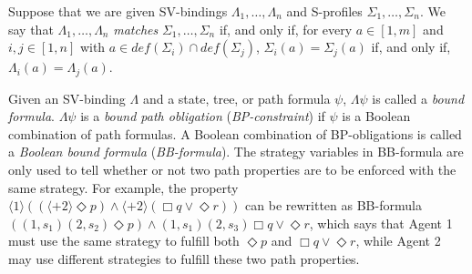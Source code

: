 \documentclass[11pt]{article}
\newcommand{\emdef}{\textit{def}}
\newcommand{\pfrr}{\Box}
\newcommand{\pevt}{\Diamond}
\begin{document}
Suppose that we are given SV-bindings $\Lambda_1,\ldots,\Lambda_n$
and S-profiles $\Sigma_1,\ldots,\Sigma_n$.   
We say that $\Lambda_1,\ldots,\Lambda_n$ {\em matches} 
$\Sigma_1,\ldots,\Sigma_n$ if, and only if, 
for every $a\in[1,m]$ and $i,j\in[1,n]$ 
with $a\in\emdef(\Sigma_i)\cap\emdef(\Sigma_j)$, 
$\Sigma_i(a)=\Sigma_j(a)$ if, and only if, 
$\Lambda_i(a)=\Lambda_j(a)$.  

Given an SV-binding $\Lambda$ 
and a state, tree, or path formula $\psi$, 
$\Lambda\psi$ is called a {\em bound formula}.  
$\Lambda\psi$ is a {\em bound path obligation} ({\em BP-constraint}) 
if $\psi$ is a Boolean combination of path formulas.  
A Boolean combination of BP-obligations is called a 
{\em Boolean bound formula} ({\em BB-formula}).  
The strategy variables in BB-formula are only used to tell 
whether or not two path properties are to be enforced with the same strategy.  
For example, the property  
$\langle 1\rangle((\langle+ 2\rangle\pevt p)\wedge 
\langle+ 2\rangle(\pfrr q\vee\pevt r))$ 
can be rewritten as BB-formula 
$((1, s_1)(2,s_2)\pevt p)\wedge 
(1, s_1)(2, s_3)\pfrr q\vee\pevt r$, which says that 
Agent 1 must use the same strategy to fulfill  
both $\pevt p$ and $\pfrr q\vee\pevt r$, while 
Agent 2 may use different strategies to fulfill these two path 
properties.  
\end{document}
